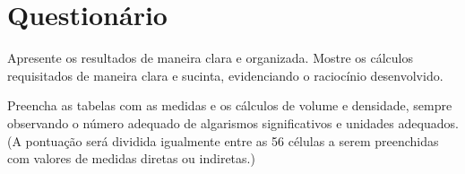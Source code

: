 
\vspace{15mm}

\begin{fullwidth}
\noindent{}
\vspace{5mm}

\noindent{}

\noindent{}

\noindent{}

\noindent{}

\noindent{}
\end{fullwidth}

\vspace{5mm}

\section{Questionário}

\begin{question}[type={exam}]{2}
Apresente os resultados de maneira clara e organizada. Mostre os cálculos requisitados de maneira clara e sucinta, evidenciando o raciocínio desenvolvido.
\end{question}

\begin{question}[type={exam}]{8}
Preencha as tabelas com as medidas e os cálculos de volume e densidade, sempre observando o número adequado de algarismos significativos e unidades adequados. (A pontuação será dividida igualmente entre as 56 células a serem preenchidas com valores de medidas diretas ou indiretas.)
\end{question}



\vfill
\pagebreak
